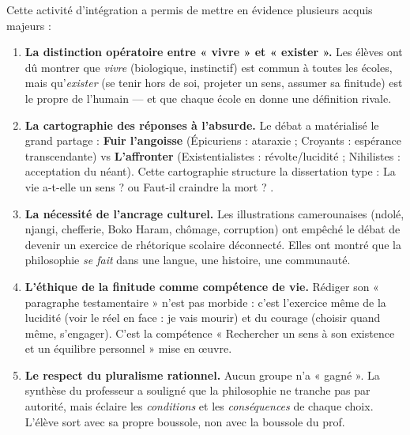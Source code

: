 \documentclass[11pt]{article}
\newcommand{\cle}[1]{{\popxbold\color{popdark}#1}}
\newcounter{popsec}
\newcounter{popsub}
\newcommand{\courssub}[1]{%
  \stepcounter{popsub}%
  \par\vspace{9pt}\noindent{\popxbold\fontsize{11.5}{13}\selectfont\color{popink}{\color{poporange}\thepopsec.\thepopsub}\hspace{6pt}#1}\par\nopagebreak\vspace{4pt}
}
\begin{document}
\courssub{Bilan de l'activité}
Cette activité d'intégration a permis de mettre en évidence plusieurs acquis majeurs :
\begin{enumerate}
    \item \textbf{La distinction opératoire entre « vivre » et « exister ».} Les élèves ont dû montrer que \emph{vivre} (biologique, instinctif) est commun à toutes les écoles, mais qu'\emph{exister} (se tenir hors de soi, projeter un sens, assumer sa finitude) est le propre de l'humain — et que chaque école en donne une définition rivale.
    \item \textbf{La cartographie des réponses à l'absurde.} Le débat a matérialisé le grand partage : \textbf{Fuir l'angoisse} (Épicuriens : ataraxie ; Croyants : espérance transcendante) vs \textbf{L'affronter} (Existentialistes : révolte/lucidité ; Nihilistes : acceptation du néant). Cette cartographie structure la dissertation type : \guillemotleft La vie a-t-elle un sens ? \guillemotright ou \guillemotleft Faut-il craindre la mort ? \guillemotright.
    \item \textbf{La nécessité de l'ancrage culturel.} Les illustrations camerounaises (ndolé, njangi, chefferie, Boko Haram, chômage, corruption) ont empêché le débat de devenir un exercice de rhétorique scolaire déconnecté. Elles ont montré que la philosophie \emph{se fait} dans une langue, une histoire, une communauté.
    \item \textbf{L'éthique de la finitude comme compétence de vie.} Rédiger son « paragraphe testamentaire » n'est pas morbide : c'est l'exercice même de la \cle{lucidité} (voir le réel en face : je vais mourir) et du \cle{courage} (choisir quand même, s'engager). C'est la compétence « Rechercher un sens à son existence et un équilibre personnel » mise en œuvre.
    \item \textbf{Le respect du pluralisme rationnel.} Aucun groupe n'a « gagné ». La synthèse du professeur a souligné que la philosophie ne tranche pas par autorité, mais éclaire les \emph{conditions} et les \emph{conséquences} de chaque choix. L'élève sort avec sa propre boussole, non avec la boussole du prof.
\end{enumerate}
\end{document}
